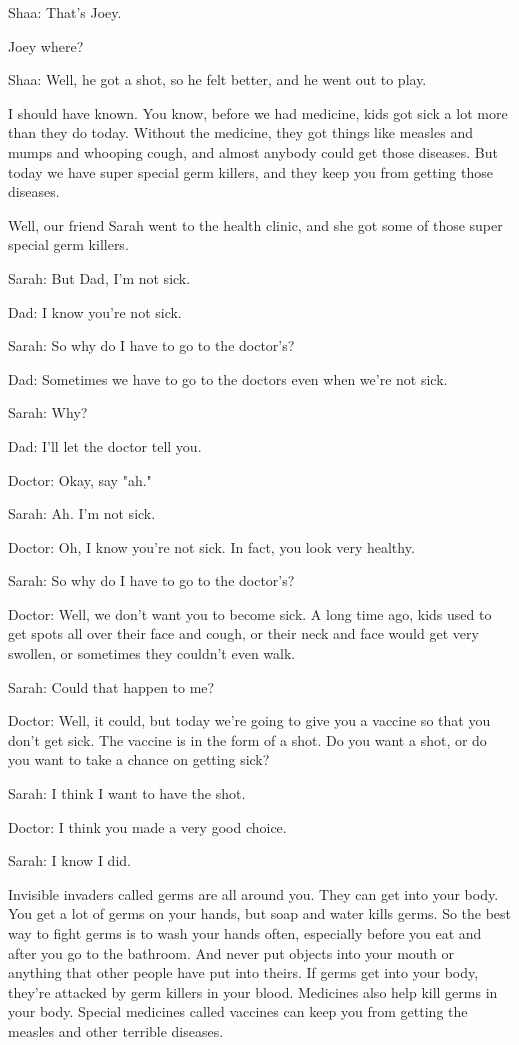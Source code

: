 Shaa: That's Joey.

Joey where?

Shaa: Well, he got a shot, so he felt better, and he went out to play.

I should have known. You know, before we had medicine, kids got sick a lot more than they do today. Without the medicine, they got things like measles and mumps and whooping cough, and almost anybody could get those diseases. But today we have super special germ killers, and they keep you from getting those diseases.

Well, our friend Sarah went to the health clinic, and she got some of those super special germ killers.

Sarah: But Dad, I'm not sick.

Dad: I know you're not sick.

Sarah: So why do I have to go to the doctor's?

Dad: Sometimes we have to go to the doctors even when we're not sick.

Sarah: Why?

Dad: I'll let the doctor tell you.

Doctor: Okay, say "ah."

Sarah: Ah. I'm not sick.

Doctor: Oh, I know you're not sick. In fact, you look very healthy.

Sarah: So why do I have to go to the doctor's?

Doctor: Well, we don't want you to become sick. A long time ago, kids used to get spots all over their face and cough, or their neck and face would get very swollen, or sometimes they couldn't even walk.

Sarah: Could that happen to me?

Doctor: Well, it could, but today we're going to give you a vaccine so that you don't get sick. The vaccine is in the form of a shot. Do you want a shot, or do you want to take a chance on getting sick?

Sarah: I think I want to have the shot.

Doctor: I think you made a very good choice.

Sarah: I know I did.

Invisible invaders called germs are all around you. They can get into your body. You get a lot of germs on your hands, but soap and water kills germs. So the best way to fight germs is to wash your hands often, especially before you eat and after you go to the bathroom. And never put objects into your mouth or anything that other people have put into theirs. If germs get into your body, they're attacked by germ killers in your blood. Medicines also help kill germs in your body. Special medicines called vaccines can keep you from getting the measles and other terrible diseases.

